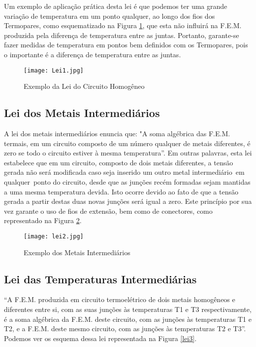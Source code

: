 \documentclass[a4paper,12pt]{report}
\begin{document}
	\singlespacing
	
	Um exemplo de aplicação prática desta lei é que podemos ter uma grande variação de temperatura em um ponto qualquer, ao longo dos fios dos Termopares, como esquematizado na Figura \ref{lei1}, que esta não influirá na F.E.M. produzida pela diferença de temperatura entre as juntas. Portanto, garante-se fazer medidas de temperatura em pontos bem definidos com os Termopares, pois o importante é a diferença de temperatura entre as juntas.
	
	\singlespacing
	
	\begin{figure}[htbp]
		\centering
		\texttt{[image: Lei1.jpg]}
		\caption{Exemplo da Lei do Circuito Homogêneo}
		\label{lei1}
	\end{figure}
	
	\subsection{Lei dos Metais Intermediários}
	
	A lei dos metais intermediários enuncia que: "A soma algébrica das F.E.M. termais, em um circuito composto de um número qualquer de metais diferentes, é zero se todo o circuito estiver à mesma temperatura”. Em outras palavras, esta lei estabelece que em um circuito, composto de dois metais diferentes, a tensão gerada não será modificada caso seja inserido um outro metal intermediário em qualquer ponto do circuito, desde que as junções recém formadas sejam mantidas a uma mesma temperatura devida. Isto ocorre devido ao fato de que a tensão gerada a partir destas duas novas junções será igual a zero. Este princípio por sua vez garante o uso de fios de extensão, bem como de conectores, como  representado na Figura \ref{lei2}.
	
	\singlespacing
	
	\begin{figure}[htbp]
		\centering
		\texttt{[image: lei2.jpg]}
		\caption{Exemplo dos Metais Intermediários}
		\label{lei2}
	\end{figure}
	
	\newpage
	\subsection{Lei das Temperaturas Intermediárias}
	
	“A F.E.M. produzida em circuito termoelétrico de dois metais homogêneos e diferentes entre si, com as suas junções às temperaturas T1 e T3 respectivamente, é a soma algébrica da F.E.M. deste circuito, com as junções às temperaturas T1 e T2, e a F.E.M. deste mesmo circuito, com as junções às temperaturas T2 e T3”. Podemos ver os esquema dessa lei representada na Figura \ref{lei3}.
	
\end{document}
